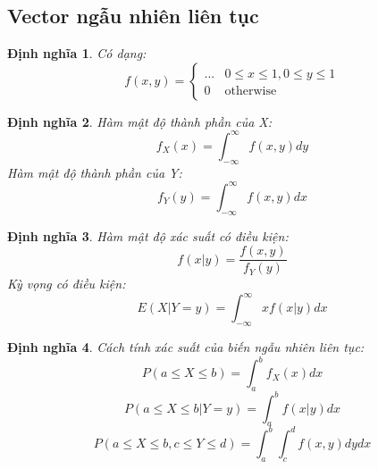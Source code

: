 \documentclass[12pt]{article}
\newtheorem{thm}{Định nghĩa}
\begin{document}
\subsection{Vector ngẫu nhiên liên tục}
\begin{thm}
    Có dạng:
    \begin{equation}
        f(x, y) = \begin{cases}
            ... & 0 \leq x \leq 1, 0 \leq y \leq 1 \\
            0 & \text{otherwise}
        \end{cases}
    \end{equation}
\end{thm}

\begin{thm}
    Hàm mật độ thành phần của X:
    \begin{equation}
        f_X (x) = \int_{-\infty}^{\infty} f(x, y)dy
    \end{equation}
    Hàm mật độ thành phần của Y:
    \begin{equation}
        f_Y (y) = \int_{-\infty}^{\infty} f(x, y)dx
    \end{equation}
\end{thm}

\begin{thm}
    Hàm mật độ xác suất có điều kiện:
    \begin{equation}
        f(x|y) = \frac{f(x, y)}{f_Y (y)}
    \end{equation}
    Kỳ vọng có điều kiện:
    \begin{equation}
        E(X | Y = y) = \int_{-\infty}^{\infty} xf(x | y)dx
    \end{equation}

\end{thm}

\begin{thm}
    Cách tính xác suất của biến ngẫu nhiên liên tục:
    \begin{equation}
        P(a \leq X \leq b) = \int_{a}^{b} f_X (x)dx
    \end{equation}
    \begin{equation}
        P(a \leq X \leq b | Y = y) = \int_{a}^{b} f(x | y)dx
    \end{equation}
    \begin{equation}
        P(a \leq X \leq b, c \leq Y \leq d) = \int_{a}^{b} \int_{c}^{d} f(x, y)dydx
    \end{equation}
\end{thm}
\end{document}

